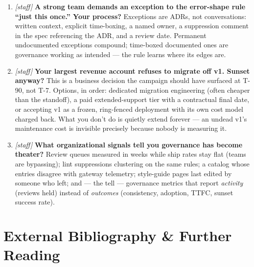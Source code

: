 \begin{enumerate}[label=\textbf{Q\arabic*.}, leftmargin=1.7cm]
        (consumer-observable surfaces only), ship the linter as
        \emph{advisory}, and stand up one paved path for \emph{new} APIs.
        Days 61--90: flip two high-value rules to blocking, run the first
        review-SLA'd design reviews, and publish the first transparency
        report. Never begin with a mandate to retrofit all 500.
  \item \emph{[staff]} \textbf{A strong team demands an exception to the
        error-shape rule ``just this once.'' Your process?} Exceptions
        are ADRs, not conversations: written context, explicit
        time-boxing, a named owner, a suppression comment in the spec
        referencing the ADR, and a review date. Permanent undocumented
        exceptions compound; time-boxed documented ones are governance
        working as intended --- the rule learns where its edges are.
  \item \emph{[staff]} \textbf{Your largest revenue account refuses to
        migrate off v1. Sunset anyway?} This is a business decision the
        campaign should have surfaced at T-90, not T-7. Options, in
        order: dedicated migration engineering (often cheaper than the
        standoff), a paid extended-support tier with a contractual final
        date, or accepting v1 as a frozen, ring-fenced deployment with
        its own cost model charged back. What you don't do is quietly
        extend forever --- an undead v1's maintenance cost is invisible
        precisely because nobody is measuring it.
  \item \emph{[staff]} \textbf{What organizational signals tell you
        governance has become theater?} Review queues measured in weeks
        while ship rates stay flat (teams are bypassing); lint suppressions
        clustering on the same rules; a catalog whose entries disagree
        with gateway telemetry; style-guide pages last edited by someone
        who left; and --- the tell --- governance metrics that report
        \emph{activity} (reviews held) instead of \emph{outcomes}
        (consistency, adoption, TTFC, sunset success rate).
\end{enumerate}

\section{External Bibliography \& Further Reading}
\label{sec:ch20-bibliography}

